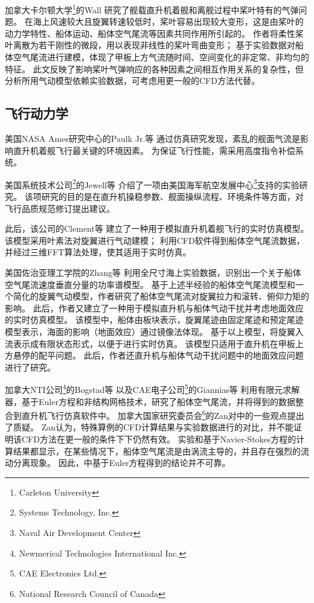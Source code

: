 加拿大卡尔顿大学\footnote{Carleton University}的Wall
研究了舰载直升机着舰和离舰过程中桨叶特有的气弹问题。
在海上风速较大且旋翼转速较低时，桨叶容易出现较大变形，这是由桨叶的动力学特性、船体运动、船体空气尾流等因素共同作用所引起的。
作者将柔性桨叶离散为若干刚性的微段，用以表现非线性的桨叶弯曲变形；
基于实验数据对船体空气尾流进行建模，体现了甲板上方气流随时间、空间变化的非定常、非均匀的特征。
此文反映了影响桨叶气弹响应的各种因素之间相互作用关系的复杂性，但分析所用气动模型依赖实验数据，可考虑用更一般的CFD方法代替。

\subsection{飞行动力学}

美国NASA Ames研究中心的Paulk Jr.等
通过仿真研究发现，紊乱的舰面气流是影响直升机着舰飞行最关键的环境因素。
为保证飞行性能，需采用高度指令补偿系统。

美国系统技术公司\footnote{Systems Technology, Inc.}的Jewell等
介绍了一项由美国海军航空发展中心\footnote{Naval Air Development Center}支持的实验研究。
该项研究的目的是在直升机操稳参数、舰面操纵流程、环境条件等方面，对飞行品质规范修订提出建议。

此后，该公司的Clement等
建立了一种用于模拟直升机着舰飞行的实时仿真模型。
该模型采用叶素法对旋翼进行气动建模；
利用CFD软件得到船体空气尾流数据，并经过三维FFT算法处理，使其适用于实时仿真。

美国佐治亚理工学院的Zhang等
利用全尺寸海上实验数据，识别出一个关于船体空气尾流速度垂直分量的功率谱模型。
基于上述半经验的船体空气尾流模型和一个简化的旋翼气动模型，作者研究了船体空气尾流对旋翼拉力和滚转、俯仰力矩的影响。
此后，作者又建立了一种用于模拟直升机与船体气动干扰并考虑地面效应的实时仿真模型。
该模型中，船体由板块表示，旋翼尾迹由固定尾迹和预定尾迹模型表示，海面的影响（地面效应）通过镜像法体现。
基于以上模型，将旋翼入流表示成有限状态形式，以便于进行实时仿真。
该模型只适用于直升机在甲板上方悬停的配平问题。
此后，作者还直升机与船体气动干扰问题中的地面效应问题进行了研究。

加拿大NTI公司\footnote{Newmerical Technologies International Inc.}的Bogstad等
以及CAE电子公司\footnote{CAE Electronics Ltd.}的Giannias等
利用有限元求解器，基于Euler方程和非结构网格技术，研究了船体空气尾流，并将得到的数据整合到直升机飞行仿真软件中。
加拿大国家研究委员会\footnote{National Research Council of Canada}的Zan对\cite{Bogstad2002}中的一些观点提出了质疑。
Zan认为，特殊算例的CFD计算结果与实验数据进行的对比，并不能证明该CFD方法在更一般的条件下下仍然有效。
实验和基于Navier-Stokes方程的计算结果都显示，在某些情况下，船体空气尾流是由涡流主导的，并且存在强烈的流动分离现象。
因此，\cite{Bogstad2002}中基于Euler方程得到的结论并不可靠。

